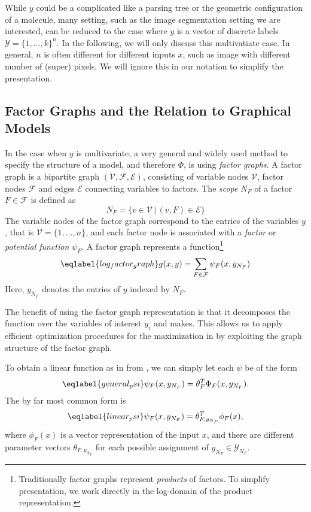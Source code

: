 While $y$ could be a complicated like a parsing tree or the geometric
configuration of a molecule, many setting, such as the image segmentation
setting we are interested, can be reduced to the case where $y$ is a vector of
discrete labels $\mathcal{Y} = \{1, \dotsc, k\}^n$.
In the following, we will only discuss this multivatiate case. In general, $n$ is often different
for different inputs $x$, such as image with different number of (super) pixels.
We will ignore this in our notation to simplify the presentation.

\subsection{Factor Graphs and the Relation to Graphical Models}
In the case when $y$ is multivariate, a very general and widely used method to
specify the structure of a model, and therefore $\Phi$, is using \emph{factor
graphs}. A factor graph is a bipartite graph $(\mathcal{V}, \mathcal{F},
\mathcal{E})$, consisting of variable nodes $\mathcal{V}$, factor nodes
$\mathcal{F}$ and edges $\mathcal{E}$ connecting variables to factors. The
\emph{scope} $N_F$ of a factor $F \in \mathcal{F}$ is defined as
\begin{equation}
    N_F = \{ v \in \mathcal{V} \,|\, (v,F) \in \mathcal{E} \}
\end{equation}
The variable nodes of the factor graph correspond to the entries of the
variables $y$, that is $\mathcal{V} = \{1, \dotsc, n\}$, and each factor node
is associated with a \emph{factor} or \emph{potential function} $\psi_F$.
A factor graph represents a function\footnote{Traditionally factor graphs
 represent \emph{products} of factors.  To simplify presentation, we work
directly in the log-domain of the product representation.}
\begin{equation}\eqlabel{log_factor_graph}
    g(x, y) = \sum_{F \in \mathcal{F}} \psi_F(x, y_{N_F})
\end{equation}
Here, $y_{N_F}$ denotes the entries of $y$ indexed by $N_F$.

The benefit of using the factor graph representation is that it decomposes the
function over the variables of interest $y_i$ and makes. This allows us to
apply efficient optimization procedures for the maximization in
 by exploiting the graph structure of the factor graph.

To obtain a linear function as in  from
, we can simply let each $\psi$ be of the form
\begin{equation}\eqlabel{general_psi}
    \psi_F(x, y_{N_F}) = \theta_F^T \Phi_F(x, y_{N_F}).
\end{equation}
The by far most common form is 
\begin{equation}\eqlabel{linear_psi}
    \psi_F(x, y_{N_F}) = \theta_{F, y_{N_F}}^T \phi_F(x),
\end{equation}
where $\phi_F(x)$ is a vector representation of the input $x$, and there are
different parameter vectors $\theta_{F, y_{N_F}}$ for each possible assignment
of $y_{N_F} \in \mathcal{Y}_{N_F}$.

